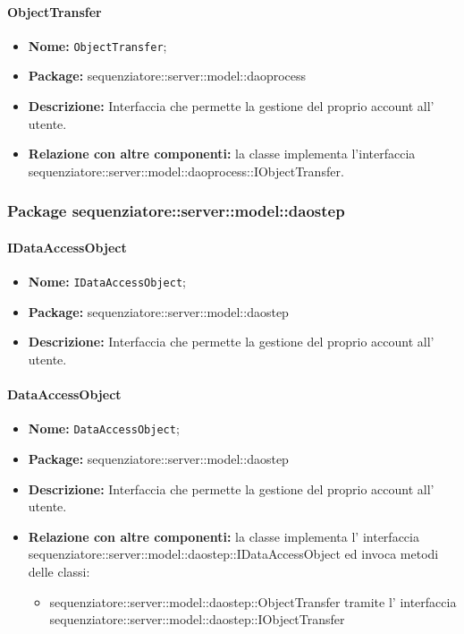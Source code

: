 \begin{itemize}
\begin{itemize}
\paragraph{ObjectTransfer}
	\begin{itemize}
		\item \textbf{Nome:} \texttt{ObjectTransfer};
		\item \textbf{Package:} sequenziatore::server::model::daoprocess
		\item \textbf{Descrizione:} Interfaccia che permette la gestione del proprio account all' utente.
		\item \textbf{Relazione con altre componenti:} la classe implementa l'interfaccia sequenziatore::server::model::daoprocess::IObjectTransfer.
	\end{itemize}
\subsubsection{Package sequenziatore::server::model::daostep}
\paragraph{IDataAccessObject}
	\begin{itemize}
		\item \textbf{Nome:} \texttt{IDataAccessObject};
		\item \textbf{Package:} sequenziatore::server::model::daostep
		\item \textbf{Descrizione:} Interfaccia che permette la gestione del proprio account all' utente.
	\end{itemize}
\paragraph{DataAccessObject}
	\begin{itemize}
		\item \textbf{Nome:} \texttt{DataAccessObject};
		\item \textbf{Package:} sequenziatore::server::model::daostep
		\item \textbf{Descrizione:} Interfaccia che permette la gestione del proprio account all' utente.
		\item \textbf{Relazione con altre componenti:} la classe implementa l' interfaccia sequenziatore::server::model::daostep::IDataAccessObject ed invoca metodi delle classi:
		\begin{itemize}
			\item sequenziatore::server::model::daostep::ObjectTransfer tramite l' interfaccia sequenziatore::server::model::daostep::IObjectTransfer
	\end{itemize}

\end{itemize}
\end{itemize}
\end{itemize}
